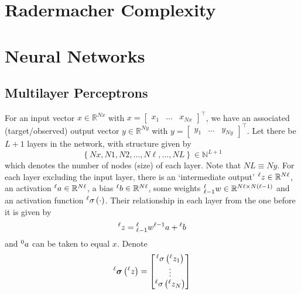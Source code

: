 \documentclass[11pt]{report} %
\begin{document}
\section{Radermacher Complexity}

\section{Neural Networks}

\subsection{Multilayer Perceptrons}

For an input vector $x\in\mathbb{R}^{Nx}$ with $x=\begin{bmatrix}x_{1} & \dots & x_{Nx}\end{bmatrix}^{\top}$, we have an associated (target/observed) output vector $y\in\mathbb{R}^{Ny}$ with $y=\begin{bmatrix}y_{1} & \dots & y_{Ny}\end{bmatrix}^{\top}$. Let there be $L + 1$ layers in the network, with structure given by
\begin{equation}
\left\{Nx,N1,N2,\dots,N\ell,\dots,NL\right\} \in \mathbb{N}^{L + 1}
\end{equation}
which denotes the number of nodes (size) of each layer. Note that $NL\equiv Ny$. For each layer excluding the input layer, there is an `intermediate output' $\mathstrut^{\ell}z\in\mathbb{R}^{N\ell}$, an activation $\mathstrut^{\ell}a\in\mathbb{R}^{N\ell}$, a bias $\mathstrut^{\ell}b\in\mathbb{R}^{N\ell}$, some weights $\mathstrut_{\ell-1}^{\ell}w\in\mathbb{R}^{N\ell\times N\left(\ell-1\right)}$ and an activation function $\mathstrut^{\ell}\sigma\left(\cdot\right)$. Their relationship in each layer from the one before it is given by
\begin{equation}
\mathstrut^{\ell}z=\mathstrut_{\ell-1}^{\ell}w\mathstrut^{\ell-1}a+\mathstrut^{\ell}b
\end{equation}
and $\mathstrut^{0}a$ can be taken to equal $x$. Denote
\begin{equation}
\mathstrut^{\ell}\boldsymbol{\sigma}\left(\mathstrut^{\ell}z\right)=\begin{bmatrix}\mathstrut^{\ell}\sigma\left(\mathstrut^{\ell} z_{1}\right)\\
\vdots\\
\mathstrut^{\ell}\sigma\left(\mathstrut^{\ell}z_{N}\right)
\end{bmatrix}
\end{equation}
\end{document}
